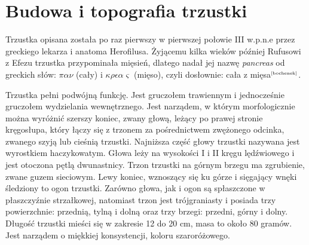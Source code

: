 \documentclass[a4paper, 12pt]{report}
\newcommand\cyt[1]{$^{\tiny{\cite{#1}}}$}
\begin{document}
\chapter{Budowa i topografia trzustki}

Trzustka opisana została po raz pierwszy w pierwszej połowie III
w.p.n.e przez greckiego lekarza i anatoma Herofilusa. Żyjącemu kilka
wieków później Rufusowi z Efezu trzustka przypominała mięsień, dlatego
nadał jej nazwę \textsl{pancreas} od greckich słów: $\pi\alpha\nu$
(cały) i $\kappa\rho\epsilon\alpha\varsigma$ (mięso), czyli dosłownie:
cała z mięsa\cyt{bochenek}.

Trzustka pełni podwójną funkcję. Jest gruczołem trawiennym i
jednocześnie gruczołem wydzielania wewnętrznego. Jest narządem, w
którym morfologicznie można wyróżnić szerszy koniec, zwany głową,
leżący po prawej stronie kręgosłupa, który łączy się z trzonem za
pośrednictwem zwężonego odcinka, zwanego szyją lub cieśnią
trzustki. Najniższa część głowy trzustki nazywana jest wyrostkiem
haczykowatym. Głowa leży na wysokości I i II kręgu lędźwiowego i jest
otoczona pętlą dwunastnicy.  Trzon trzustki na górnym brzegu ma
zgrubienie, zwane guzem sieciowym. Lewy koniec, wznoszący się ku górze
i sięgający wnęki śledziony to ogon trzustki.  Zarówno głowa, jak i
ogon są spłaszczone w płaszczyźnie strzałkowej, natomiast trzon jest
trójgraniasty i posiada trzy powierzchnie: przednią, tylną i dolną
oraz trzy brzegi: przedni, górny i dolny.  Długość trzustki mieści się
w zakresie 12 do 20 cm, masa to około 80 gramów. Jest narządem o
miękkiej konsystencji, koloru szaroróżowego.
\end{document}
